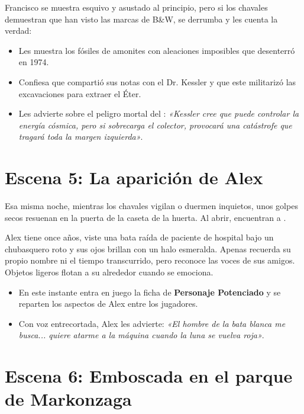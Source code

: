 Francisco se muestra esquivo y asustado al principio, pero si los chavales demuestran que han visto las marcas de B\&W, se derrumba y les cuenta la verdad:
\begin{itemize}
  \item Les muestra los fósiles de amonites con aleaciones imposibles que desenterró en 1974.
  \item Confiesa que compartió sus notas con el Dr. Kessler y que este militarizó las excavaciones para extraer el Éter.
  \item Les advierte sobre el peligro mortal del : \emph{«Kessler cree que puede controlar la energía cósmica, pero si sobrecarga el colector, provocará una catástrofe que tragará toda la margen izquierda»}.
\end{itemize}

\section{Escena 5: La aparición de Alex}


Esa misma noche, mientras los chavales vigilan o duermen inquietos, unos golpes secos resuenan en la puerta de la caseta de la huerta. Al abrir, encuentran a .

Alex tiene once años, viste una bata raída de paciente de hospital bajo un chubasquero roto y sus ojos brillan con un halo esmeralda. Apenas recuerda su propio nombre ni el tiempo transcurrido, pero reconoce las voces de sus amigos. Objetos ligeros flotan a su alrededor cuando se emociona.
\begin{itemize}
  \item {} En este instante entra en juego la ficha de \textbf{Personaje Potenciado} y se reparten los aspectos de Alex entre los jugadores.
  \item {} Con voz entrecortada, Alex les advierte: \emph{«El hombre de la bata blanca me busca... quiere atarme a la máquina cuando la luna se vuelva roja»}.
\end{itemize}

\section{Escena 6: Emboscada en el parque de Markonzaga}

